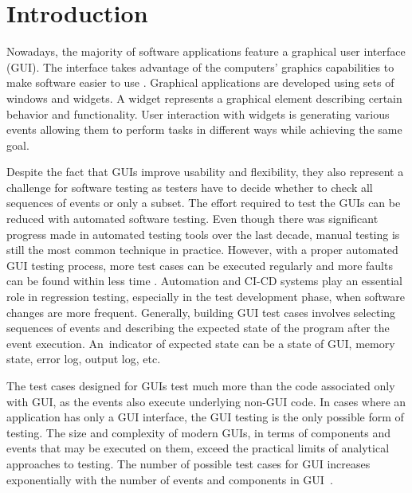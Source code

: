 
\chapter{Introduction}
Nowadays, the majority of software applications feature a graphical user interface (GUI). The interface takes advantage of the computers' graphics capabilities to make software easier to use \cite{guidefinition}. Graphical applications are developed using sets of windows and widgets. A widget represents a graphical element describing certain behavior and functionality. User interaction with widgets is generating various events allowing them to perform tasks in different ways while achieving the same goal. 

Despite the fact that GUIs improve usability and flexibility, they also represent a challenge for software testing as testers have to decide whether to check all sequences of events or only a subset. The effort required to test the GUIs can be reduced with automated software testing. Even though there was significant progress made in automated testing tools over the last decade, manual testing is still the most common technique in practice. However, with a proper automated GUI testing process, more test cases can be executed regularly and more faults can be found within less time \cite{patternbasedtesting}. Automation and CI-CD systems play an essential role in regression testing, especially in the test development phase, when software changes are more frequent. Generally, building GUI test cases involves selecting sequences of events and describing the expected state of the program after the event execution. An~indicator of expected state can be a state of GUI, memory state, error log, output log, etc. 

The test cases designed for GUIs test much more than the code associated only with GUI, as the events also execute underlying non-GUI code. In cases where an application has only a GUI interface, the GUI testing is the only possible form of testing. The size and complexity of modern GUIs, in terms of components and events that may be executed on them, exceed the practical limits of analytical approaches to testing. The number of possible test cases for GUI increases exponentially with the number of events and components in GUI~\cite{NguyenBao2014Gait}.

